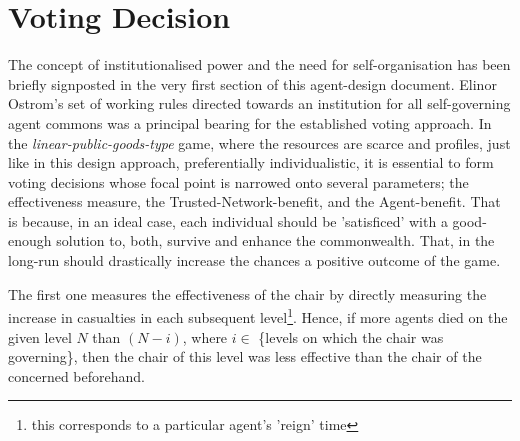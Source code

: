 
\clearpage

\section{Voting Decision}

The concept of institutionalised power and the need for self-organisation has been briefly signposted in the very first section of this agent-design document. Elinor Ostrom's set of working rules directed towards an institution for all self-governing agent commons was a principal bearing for the established voting approach. In the \textit{linear-public-goods-type} game, where the resources are scarce and profiles, just like in this design approach, preferentially individualistic, it is essential to form voting decisions whose focal point is narrowed onto several parameters; the effectiveness measure, the Trusted-Network-benefit, and the Agent-benefit. That is because, in an ideal case, each individual should be 'satisficed' with a good-enough solution to, both, survive and enhance the commonwealth. That, in the long-run should drastically increase the chances a positive outcome of the game.

The first one measures the effectiveness of the chair by directly measuring the increase in casualties in each subsequent level\footnote{this corresponds to a particular agent's 'reign' time}. Hence, if more agents died on the given level $N$ than $(N-i)$, where $i \in$ \{levels on which the chair was governing\}, then the chair of this level was less effective than the chair of the concerned beforehand.

